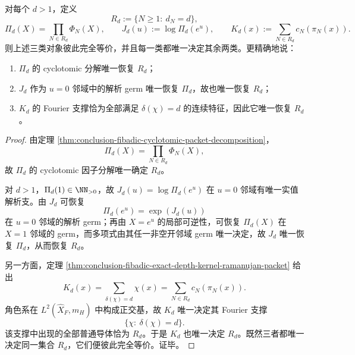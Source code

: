 \begin{theorem}\label{thm:conclusion-fibadic-depth-packet-triple-completeness}
对每个 \(d>1\)，定义
\[
R_d:=\{N\ge 1:\ d_N=d\},
\]
\[
\Pi_d(X)=\prod_{N\in R_d}\Phi_N(X),
\qquad
J_d(u):=\log \Pi_d(e^u),
\qquad
K_d(x):=\sum_{N\in R_d}c_N(\pi_N(x)).
\]
则上述三类对象彼此完全等价，并且每一类都唯一决定其余两类。更精确地说：
\begin{enumerate}
  \item \(\Pi_d\) 的 cyclotomic 分解唯一恢复 \(R_d\)；
  \item \(J_d\) 作为 \(u=0\) 邻域中的解析 germ 唯一恢复 \(\Pi_d\)，故也唯一恢复 \(R_d\)；
  \item \(K_d\) 的 Fourier 支撑恰为全部满足 \(\delta(\chi)=d\) 的连续特征，因此它唯一恢复 \(R_d\)。
\end{enumerate}
\end{theorem}
\begin{proof}
由定理 \ref{thm:conclusion-fibadic-cyclotomic-packet-decomposition}，
\[
\Pi_d(X)=\prod_{N\in R_d}\Phi_N(X),
\]
故 \(\Pi_d\) 的 cyclotomic 因子分解唯一确定 \(R_d\)。

对 \(d>1\)，\(\Pi_d(1)\in \NN_{>0}\)，故 \(J_d(u)=\log \Pi_d(e^u)\) 在 \(u=0\) 邻域有唯一实值解析支。由 \(J_d\) 可恢复
\[
\Pi_d(e^u)=\exp(J_d(u))
\]
在 \(u=0\) 邻域的解析 germ；再由 \(X=e^u\) 的局部可逆性，可恢复 \(\Pi_d(X)\) 在 \(X=1\) 邻域的 germ，而多项式由其任一非空开邻域 germ 唯一决定，故 \(J_d\) 唯一恢复 \(\Pi_d\)，从而恢复 \(R_d\)。

另一方面，定理 \ref{thm:conclusion-fibadic-exact-depth-kernel-ramanujan-packet} 给出
\[
K_d(x)=\sum_{\delta(\chi)=d}\chi(x)
=
\sum_{N\in R_d}c_N(\pi_N(x)).
\]
角色系在 \(L^2(\widehat X_F,m_H)\) 中构成正交基，故 \(K_d\) 唯一决定其 Fourier 支撑
\[
\{\chi:\ \delta(\chi)=d\}.
\]
该支撑中出现的全部普通导体恰为 \(R_d\)。于是 \(K_d\) 也唯一决定 \(R_d\)。既然三者都唯一决定同一集合 \(R_d\)，它们便彼此完全等价。证毕。
\end{proof}

